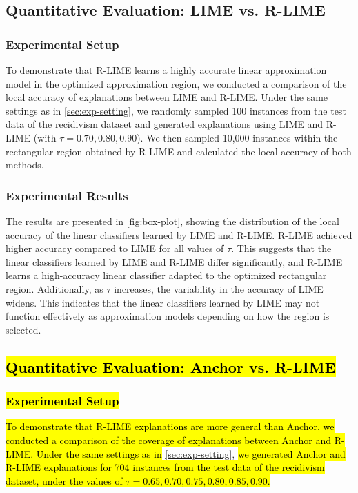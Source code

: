 \documentclass[runningheads]{llncs}
\begin{document}
{\vspace{-1pt}
\subsection{Quantitative Evaluation: LIME vs. R-LIME}

\subsubsection{Experimental Setup}
To demonstrate that R-LIME learns a highly accurate linear approximation model
in the optimized approximation region,
we conducted a comparison of the local accuracy of explanations
between LIME and R-LIME\@.
Under the same settings as in \cref{sec:exp-setting},
we randomly sampled 100 instances from the test data of the recidivism dataset
and generated explanations using LIME and R-LIME (with $\tau=0.70,0.80,0.90$).
We then sampled 10,000 instances within the rectangular region
obtained by R-LIME and calculated the local accuracy of both methods.

\subsubsection{Experimental Results}
The results are presented in \cref{fig:box-plot},
showing the distribution of the local accuracy of the linear classifiers
learned by LIME and R-LIME\@.
R-LIME achieved higher accuracy compared to LIME for all values of $\tau$.
This suggests that the linear classifiers learned by LIME and R-LIME
differ significantly,
and R-LIME learns a high-accuracy linear classifier
adapted to the optimized rectangular region.
Additionally, as $\tau$ increases,
the variability in the accuracy of LIME widens.
This indicates that the linear classifiers learned by LIME may not function
effectively as approximation models depending on how the region is selected.

\subsection{\hl{Quantitative Evaluation: Anchor vs. R-LIME}}\label{sec:exp-anchor}
\subsubsection{\hl{Experimental Setup}}
\hl{%
  To demonstrate that R-LIME explanations are more general than Anchor,
  we conducted a comparison of the coverage of explanations
  between Anchor and R-LIME\@.
  Under the same settings as in
}\cref{sec:exp-setting},
\hl{%
  we generated Anchor and R-LIME explanations
  for 704 instances from the test data of the recidivism dataset,
  under the values of $\tau=0.65,0.70,0.75,0.80,0.85,0.90$.
}

}
\end{document}
